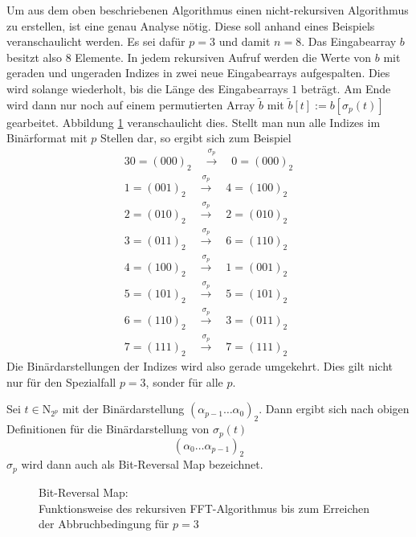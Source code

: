 			Um aus dem oben beschriebenen Algorithmus einen nicht-rekursiven Algorithmus zu erstellen, ist eine genau Analyse nötig.
			Diese soll anhand eines Beispiels veranschaulicht werden.
			Es sei dafür $p=3$ und damit $n=8$.
			Das Eingabearray $b$ besitzt also $8$ Elemente.
			In jedem rekursiven Aufruf werden die Werte von $b$ mit geraden und ungeraden Indizes in zwei neue Eingabearrays aufgespalten.
			Dies wird solange wiederholt, bis die Länge des Eingabearrays $1$ beträgt.
			Am Ende wird dann nur noch auf einem permutierten Array $\tilde{b}$ mit $\tilde{b}[t]:=b[\sigma_p(t)]$ gearbeitet.
			Abbildung \ref{fig:bit-reversal} veranschaulicht dies.
			Stellt man nun alle Indizes im Binärformat mit $p$ Stellen dar, so ergibt sich zum Beispiel
			\begin{alignat*}{3}
				0 = (000)_2 \quad\stackrel{\sigma_p}{\longrightarrow}\quad 0 = (000)_2 \\
				1 = (001)_2 \quad\stackrel{\sigma_p}{\longrightarrow}\quad 4 = (100)_2 \\
				2 = (010)_2 \quad\stackrel{\sigma_p}{\longrightarrow}\quad 2 = (010)_2 \\
				3 = (011)_2 \quad\stackrel{\sigma_p}{\longrightarrow}\quad 6 = (110)_2 \\
				4 = (100)_2 \quad\stackrel{\sigma_p}{\longrightarrow}\quad 1 = (001)_2 \\
				5 = (101)_2 \quad\stackrel{\sigma_p}{\longrightarrow}\quad 5 = (101)_2 \\
				6 = (110)_2 \quad\stackrel{\sigma_p}{\longrightarrow}\quad 3 = (011)_2 \\
				7 = (111)_2 \quad\stackrel{\sigma_p}{\longrightarrow}\quad 7 = (111)_2
			\end{alignat*}
			Die Binärdarstellungen der Indizes wird also gerade umgekehrt.
			Dies gilt nicht nur für den Spezialfall $p=3$, sonder für alle $p$.

			\begin{proposition*}
				Sei $t\in\mathrm{N}_{2^p}$ mit der Binärdarstellung $(\alpha_{p-1}\ldots\alpha_0)_2$.
				Dann ergibt sich nach obigen Definitionen für die Binärdarstellung von $\sigma_p(t)$
				\[ (\alpha_0\ldots\alpha_{p-1})_2 \]
				$\sigma_p$ wird dann auch als Bit-Reversal Map bezeichnet.
			\end{proposition*}

			\begin{figure}[p]
				\center
				
				\caption{Bit-Reversal Map: \\ Funktionsweise des rekursiven FFT-Algorithmus bis zum Erreichen der Abbruchbedingung für $p=3$}
				\label{fig:bit-reversal}
			\end{figure}

